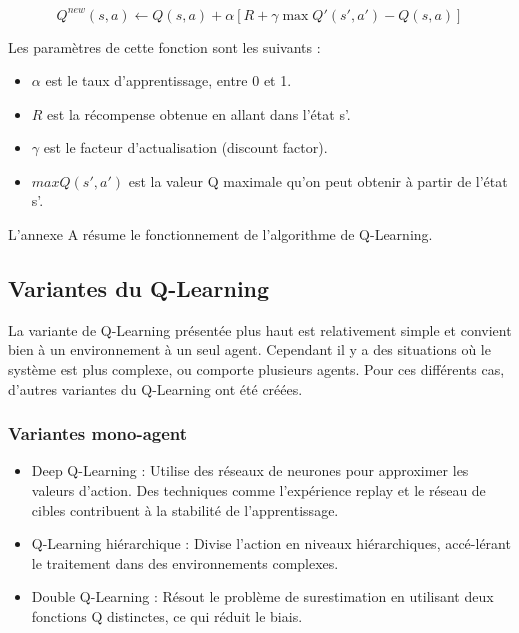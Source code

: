 \documentclass[a4paper]{article}
\begin{document}
    $$ Q^{new}(s,a) \leftarrow Q(s,a) + \alpha [R + \gamma \max Q'(s',a') - Q(s,a)]$$

    Les paramètres de cette fonction sont les suivants :

    \begin{itemize}
        \item $\alpha$ est le taux d'apprentissage, entre 0 et 1.
        \item $R$ est la récompense obtenue en allant dans l'état s'.
        \item $\gamma$ est le facteur d'actualisation (discount factor).
        \item $maxQ(s',a')$ est la valeur Q maximale qu'on peut obtenir à partir de l'état s'.
    \end{itemize}

    L'annexe A résume le fonctionnement de l'algorithme de Q-Learning.

    \subsection{Variantes du Q-Learning}

    La variante de Q-Learning présentée plus haut est relativement simple et convient bien à un environnement à un seul agent.
    Cependant il y a des situations où le système est plus complexe, ou comporte plusieurs agents.
    Pour ces différents cas, d'autres variantes du Q-Learning ont été créées.

    \subsubsection{Variantes mono-agent}

    \begin{itemize}
        \item Deep Q-Learning \cite{liu_deep_2017} : Utilise des réseaux de neurones pour approximer les valeurs d'action. Des techniques comme l'expérience replay et le réseau de cibles contribuent à la stabilité de l'apprentissage.
        \item Q-Learning hiérarchique \cite{junius_ho_hiq_2006} : Divise l'action en niveaux hiérarchiques, accé-lérant le traitement dans des environnements complexes.
        \item Double Q-Learning \cite{hasselt_double_nodate} : Résout le problème de surestimation en utilisant deux fonctions Q distinctes, ce qui réduit le biais.
\end{itemize}
\end{document}

